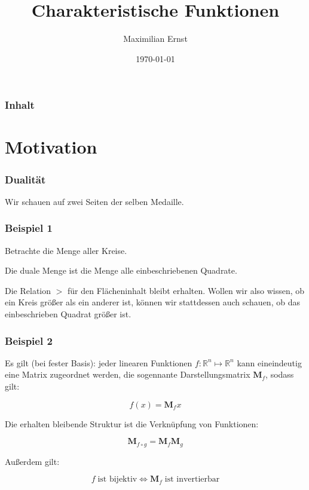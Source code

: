 \documentclass{beamer}
\newcommand{\R}{\mathbb{R}}
\newcommand{\M}{\mathbf{M}}
\begin{document}
\title{Charakteristische Funktionen}
\author{Maximilian Ernst}
\date{\today}
\begin{frame}
\titlepage
\end{frame}

\begin{frame}\frametitle{Inhalt}\tableofcontents\end{frame}

\section{Motivation}
\begin{frame}
\frametitle{Dualität}
Wir schauen auf zwei Seiten der selben Medaille.
\end{frame}

\begin{frame}
\frametitle{Beispiel 1}
Betrachte die Menge aller Kreise.

Die duale Menge ist die Menge alle einbeschriebenen Quadrate.

Die Relation $>$ für den Flächeninhalt bleibt erhalten. Wollen wir also wissen, ob ein Kreis größer als ein anderer ist, können wir stattdessen auch schauen, ob das einbeschrieben Quadrat größer ist.
\end{frame}

\begin{frame}
\frametitle{Beispiel 2}
Es gilt (bei fester Basis): jeder linearen Funktionen $f: \R^n \mapsto \R^n$ kann eineindeutig eine Matrix zugeordnet werden, die sogennante Darstellungsmatrix $\M_f$, sodass gilt:

$$f(x) = \M_fx$$

Die erhalten bleibende Struktur ist die Verknüpfung von Funktionen:

$$\M_{f \circ g} = \M_f \M_g$$

Außerdem gilt:

$$f \; \text{ist bijektiv} \iff \M_f \; \text{ist invertierbar}$$
\end{frame}
\end{document}
